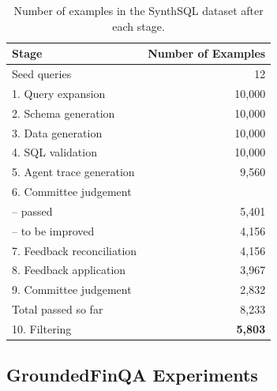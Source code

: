 \documentclass[11pt]{article}
\newcommand{\synthsubset}{SynthSQL\xspace}
\newcommand{\groundedfinqa}{GroundedFinQA\xspace}
\begin{document}
\begin{table}[t]
\centering
\small
\setlength{\tabcolsep}{6pt}
\begin{tabular}{lr}
\toprule
\textbf{Stage} & \textbf{Number of Examples} \\
\midrule
Seed queries                       & 12      \\
1. Query expansion                 & 10{,}000 \\
2. Schema generation               & 10{,}000 \\
3. Data generation                 & 10{,}000 \\
4. SQL validation                  & 10{,}000 \\
5. Agent trace generation          & 9{,}560  \\
6. Committee judgement             &         \\
\quad -- passed                    & 5{,}401  \\
\quad -- to be improved            & 4{,}156  \\
7. Feedback reconciliation         & 4{,}156  \\
8. Feedback application            & 3{,}967  \\
9. Committee judgement             & 2{,}832  \\
\midrule
Total passed so far                & 8{,}233  \\
10. Filtering                      & \textbf{5{,}803} \\
\bottomrule
\end{tabular}
\caption{Number of examples in the \synthsubset dataset after each stage.}
\label{tab:synthsubset_numbers}
\end{table}

\subsection{\groundedfinqa Experiments}
\end{document}
